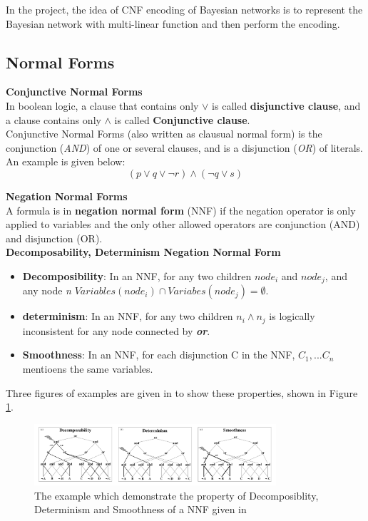     \noindent In the project, the idea of CNF encoding of Bayesian networks is to represent the Bayesian network with multi-linear function and then perform the encoding.
    
    \subsection{Normal Forms}
    \textbf{Conjunctive Normal Forms}\\
    
    \noindent In boolean logic, a clause that contains only $\vee$ is called \textbf{disjunctive clause}, and a clause contains only $\wedge$ is called \textbf{Conjunctive clause}.\\
    Conjunctive Normal Forms (also written as clausual normal form) is  the conjunction (\textit{AND}) of one or several clauses, and is a disjunction (\textit{OR}) of literals. An example is given below: $$(p \vee q \vee \neg r) \wedge (\neg q \vee s)$$
    
    \noindent \textbf{Negation Normal Forms}\\
    
    \noindent A formula is in \textbf{negation normal form}  (NNF) if the negation operator is only applied to variables and the only other allowed operators are conjunction (AND) and disjunction (OR).\\
    \newpage
    \noindent \textbf{Decomposability, Determinism Negation Normal Form}\\
    
    \begin{itemize}
        \item \textbf{Decomposibility}: In an NNF, for any two children $node_{i}$ and $node_{j}$, and any node \textit{n} $Variables(node_{i}) \cap Variabes(node_{j}) = \emptyset$.
        \item \textbf{determinism}: In an NNF, for any two children $n_{i} \wedge n_{j}$ is logically inconsistent for any node connected by \textbf{\textit{or}}.
        \item \textbf{Smoothness}: In an NNF, for each disjunction C in the NNF, $C_{1}, ... C_{n}$ mentioens the same variables.
    \end{itemize}
    
    \noindent Three figures of examples are given in \cite{2002language-map} to show these properties, shown in Figure \ref{fig:demo-DDNNF}.
    \begin{figure}
        \centering
        \includegraphics[width = 0.8\textwidth]{pic/DDNNF.png}
        \caption{The example which demonstrate the property of Decomposiblity, Determinism and Smoothness of a NNF given in \cite{2002language-map}}
        \label{fig:demo-DDNNF}
    \end{figure}
    
